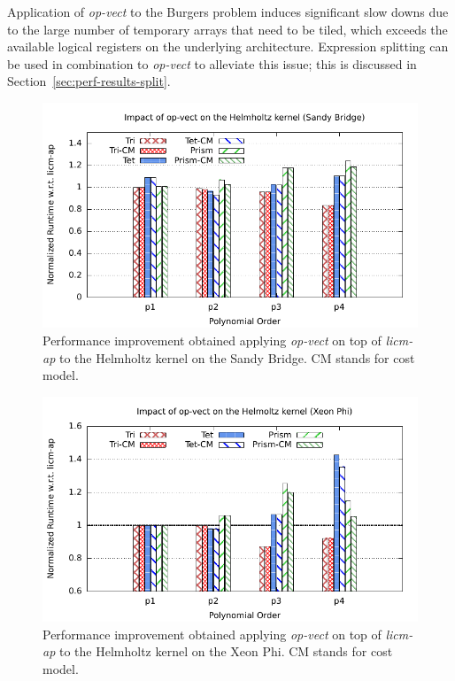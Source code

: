 \documentclass[conference]{IEEEtran}
\begin{document}
Application of \emph{op-vect} to the Burgers problem induces significant slow downs due to the large number of temporary arrays that need to be tiled, which exceeds the available logical registers on the underlying architecture. Expression splitting can be used in combination to \emph{op-vect} to alleviate this issue; this is discussed in Section~\ref{sec:perf-results-split}.

\begin{figure}[h]
\includegraphics[scale=0.7]{Pictures/helmholtz-normalized-opvect.pdf}
\caption{Performance improvement obtained applying \emph{op-vect} on top of \emph{licm-ap} to the Helmholtz kernel on the Sandy Bridge. CM stands for cost model.}
\label{fig:opvect-helmholtz-speedup}
\end{figure}

\begin{figure}[h]
\includegraphics[scale=0.7]{Pictures/helmholtz-normalized-opvect-phi.pdf}
\caption{Performance improvement obtained applying \emph{op-vect} on top of \emph{licm-ap} to the Helmholtz kernel on the Xeon Phi. CM stands for cost model.}
\label{fig:opvect-helmholtz-speedup-phi}
\end{figure}
\end{document}
